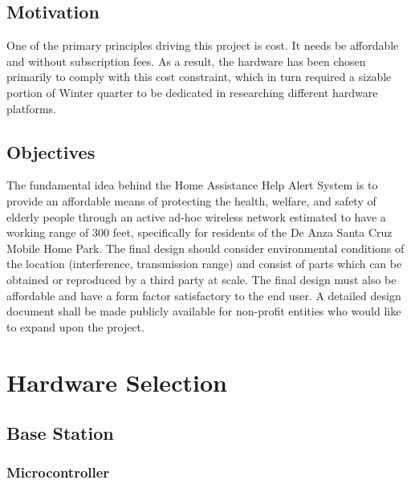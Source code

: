 \documentclass[journal,compsoc]{IEEEtran}
\begin{document}
\subsection{Motivation}
One of the primary principles driving this project is cost.  It needs be affordable and without subscription fees.  As a result, the hardware has been chosen primarily to comply with this cost constraint, which in turn required a sizable portion of Winter quarter to be dedicated in researching different hardware platforms.

\subsection{Objectives}
The fundamental idea behind the Home Assistance Help Alert System is to provide an affordable means of protecting the health, welfare, and safety of elderly people through an active ad-hoc wireless network estimated to have a working range of 300 feet, specifically for residents of the De Anza Santa Cruz Mobile Home Park.  The final design should consider environmental conditions of the location (interference, transmission range) and consist of parts which can be obtained or reproduced by a third party at scale.  The final design must also be affordable and have a form factor satisfactory to the end user.  A detailed design document shall be made publicly available for non-profit entities who would like to expand upon the project.

\section{Hardware Selection}

\subsection{Base Station}

\subsubsection{Microcontroller}
\end{document}
